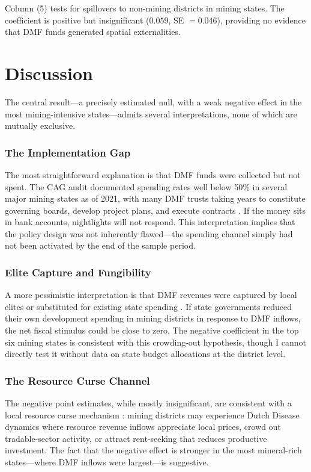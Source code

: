 \documentclass[12pt]{article}
\begin{document}
Column (5) tests for spillovers to non-mining districts in mining states. The coefficient is positive but insignificant ($0.059$, SE $= 0.046$), providing no evidence that DMF funds generated spatial externalities.



\section{Discussion}

The central result---a precisely estimated null, with a weak negative effect in the most mining-intensive states---admits several interpretations, none of which are mutually exclusive.

\subsubsection*{The Implementation Gap} The most straightforward explanation is that DMF funds were collected but not spent. The CAG audit documented spending rates well below 50\% in several major mining states as of 2021, with many DMF trusts taking years to constitute governing boards, develop project plans, and execute contracts \citep{cag2021dmf}. If the money sits in bank accounts, nightlights will not respond. This interpretation implies that the policy design was not inherently flawed---the spending channel simply had not been activated by the end of the sample period.

\subsubsection*{Elite Capture and Fungibility} A more pessimistic interpretation is that DMF revenues were captured by local elites or substituted for existing state spending \citep{reinikka2004local, olken2007monitoring}. If state governments reduced their own development spending in mining districts in response to DMF inflows, the net fiscal stimulus could be close to zero. The negative coefficient in the top six mining states is consistent with this crowding-out hypothesis, though I cannot directly test it without data on state budget allocations at the district level.

\subsubsection*{The Resource Curse Channel} The negative point estimates, while mostly insignificant, are consistent with a local resource curse mechanism \citep{van2011local}: mining districts may experience Dutch Disease dynamics where resource revenue inflows appreciate local prices, crowd out tradable-sector activity, or attract rent-seeking that reduces productive investment. The fact that the negative effect is stronger in the most mineral-rich states---where DMF inflows were largest---is suggestive.
\end{document}
